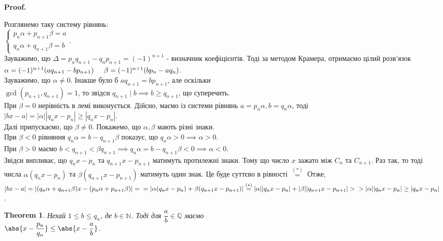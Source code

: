 \documentclass[a4paper, 10pt]{article}
\makeatletter
\theoremstyle{theoremdd}
\newtheorem{theorem}{Theorem}[subsection]
\theoremstyle{theoremdd}
\theoremstyle{theoremdd}
\theoremstyle{theoremdd}
\theoremstyle{theoremdd}
\theoremstyle{theoremdd}
\theoremstyle{theoremdd}
\theoremstyle{theoremdd}
\renewenvironment{proof}[1][Proof.\\]{\par
\pushQED{\hfill \qed}%
\normalfont \topsep6\p@\@plus6\p@\relax
\trivlist
\item\relax
{\bfseries
#1\@addpunct{.}}\hspace\labelsep\ignorespaces
}{%
\popQED\endtrivlist\@endpefalse
}
\makeatother
\begin{document}
\begin{proof}
Розглянемо таку систему рівнянь:\\
$\begin{cases} 
p_n \alpha + p_{n+1} \beta = a \\
q_n \alpha + q_{n+1} \beta = b
\end{cases}$.\\
Зауважимо, що $\Delta = p_n q_{n+1}  -q_n p_{n+1} = (-1)^{n+1}$ - визначник коефіцієнтів. Тоді за методом Крамера, отримаємо цілий розв'язок\\
$\alpha = (-1)^{n+1}(aq_{n+1} - bp_{n+1}) \hspace{0.5cm} \beta = (-1)^{n+1}(bp_n - aq_n)$.\\
Зауважимо, що $\alpha \neq 0$. Інакше було б $aq_{n+1}  =bp_{n+1}$, але оскільки \\ $\gcd(p_{n+1},q_{n+1}) = 1$, то звідси $q_{n+1} \mid b \implies b \geq q_{n+1}$, що суперечить.\\
При $\beta = 0$ нерівність в лемі виконується. Дійсно, маємо із системи рівнянь $a = p_n \alpha, b = q_n \alpha$, тоді\\
$|bx-a| = |\alpha| |q_n x - p_n| \geq |q_n x - p_n|$.
\bigskip \\
Далі припускаємо, що $\beta \neq 0$. Покажемо, що $\alpha,\beta$ мають різні знаки. \\
При $\beta < 0$ рівняння $q_n \alpha = b - q_{n+1} \beta$ показує, що $q_n \alpha > 0 \implies \alpha > 0$. \\
При $\beta > 0$ маємо $b \iffalse \overset{\text{умова}}{<} \fi < q_{n+1} < \beta q_{n+1} \implies q_n \alpha  = b - q_{n+1}\beta < 0 \implies \alpha < 0$.\\
Звідси випливає, що $q_n x - p_n$ та $q_{n+1}x - p_{n+1}$ матимуть протилежні знаки. Тому що число $x$ зажато між $C_n$ та $C_{n+1}$. Раз так, то тоді числа $\alpha(q_n x - p_n)$ та $\beta(q_{n+1}x- p_{n+1})$ матимуть один знак. Це буде суттєво в рівності $\overset{(*)}{=}$ Отже,\\
$|bx - a | = |(q_n \alpha + q_{n+1} \beta)x - (p_n \alpha + p_{n+1} \beta)| = \\ =|\alpha (q_nx-p_n) + \beta(q_{n+1}x - p_{n+1})| \overset{(*)}{=} |\alpha| |q_nx-p_n| + |\beta| |q_{n+1}x - p_{n+1}| > \\ > |\alpha| |q_nx - p_n| \geq |q_n x - p_n|$.
\end{proof}

\begin{theorem}
Нехай $1 \leq b \leq q_n$, де $b \in \mathbb{N}$. Тоді для $\dfrac{a}{b} \in \mathbb{Q}$ маємо\\
$\abs{x - \dfrac{p_n}{q_n}} \leq \abs{x - \dfrac{a}{b}}$.
\end{theorem}
\end{document}
